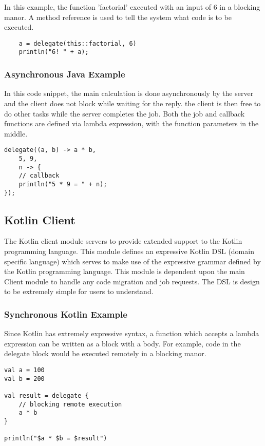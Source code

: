In this example, the function 'factorial' executed with an input of 6
in a blocking manor.
A method reference is used to tell the system what
code is to be executed.

\begin{lstlisting}
    a = delegate(this::factorial, 6)
    println("6! " + a);
\end{lstlisting}

\subsubsection{Asynchronous Java Example}

In this code snippet, the main calculation is done asynchronously
by the server and the client does not block while waiting for the reply.
the client is then free to do other tasks while the server completes the job.
Both the job and callback functions are defined via lambda expression, with
the function parameters in the middle.

\begin{lstlisting}
delegate((a, b) -> a * b,
    5, 9,
    n -> {
    // callback
    println("5 * 9 = " + n);
});
\end{lstlisting}

\subsection{Kotlin Client}\label{subsec:kotlinClient}
The Kotlin client module servers to provide extended support to the Kotlin
programming language.
This module defines an expressive Kotlin DSL (domain specific language) which
serves to make use of the expressive grammar defined by the Kotlin programming language.
This module is dependent upon the main Client module to handle any code migration and job requests.
The DSL is design to be extremely simple for users to understand.

\subsubsection{Synchronous Kotlin Example}

Since Kotlin has extremely expressive syntax, a function which accepts a
lambda expression can be written as a block with a body.
For example, code in the delegate block would be executed remotely in a blocking manor.

\begin{lstlisting}
val a = 100
val b = 200

val result = delegate {
    // blocking remote execution
    a * b
}

println("$a * $b = $result")
\end{lstlisting}

